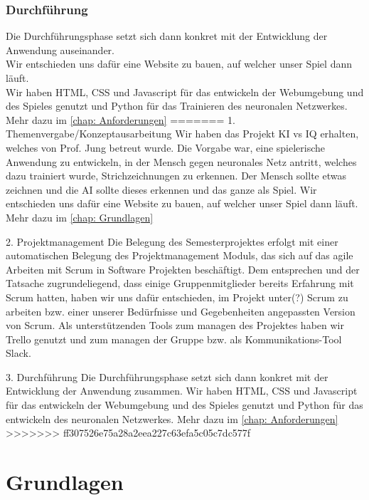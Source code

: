 \documentclass[11pt]{article}
\begin{document}
\subsubsection{ Durchführung }
Die Durchführungsphase setzt sich dann konkret mit der 					Entwicklung der Anwendung auseinander.\\
Wir entschieden uns dafür eine Website zu bauen, auf welcher 			unser Spiel dann läuft.\\
Wir haben HTML, CSS und Javascript für das entwickeln der 			Webumgebung und des Spieles genutzt und Python für das 				Trainieren des neuronalen Netzwerkes.\\
Mehr dazu im \autoref{chap: Anforderungen}
=======
1. Themenvergabe/Konzeptausarbeitung
	Wir haben das Projekt KI vs IQ erhalten, welches von Prof. Jung 		betreut wurde.
	Die Vorgabe war, eine spielerische Anwendung zu entwickeln, 			in der Mensch gegen neuronales Netz antritt, welches dazu 				trainiert wurde, Strichzeichnungen zu erkennen.
	Der Mensch sollte etwas zeichnen und die AI sollte dieses 				erkennen und das ganze als Spiel.
	Wir entschieden uns dafür eine Website zu bauen, auf welcher 			unser Spiel dann läuft. \\
	Mehr dazu im \autoref{chap: Grundlagen}

2. Projektmanagement
	Die Belegung des Semesterprojektes erfolgt mit einer 						automatischen Belegung des Projektmanagement Moduls, 				das sich auf das agile Arbeiten mit Scrum in Software 				Projekten beschäftigt. Dem entsprechen und der Tatsache 				zugrundeliegend, dass einige Gruppenmitglieder bereits 					Erfahrung mit Scrum hatten, haben wir uns dafür entschieden, im 	Projekt unter(?) Scrum zu arbeiten bzw. einer unserer 						Bedürfnisse und Gegebenheiten angepassten Version von 				Scrum.
	Als unterstützenden Tools zum managen des Projektes haben wir 	Trello genutzt und zum managen der Gruppe bzw. als 						Kommunikations-Tool Slack.
	

3. Durchführung
	Die Durchführungsphase setzt sich dann konkret mit der 					Entwicklung der Anwendung zusammen.
	Wir haben HTML, CSS und Javascript für das entwickeln der 			Webumgebung und des Spieles genutzt und Python für das 				entwickeln des neuronalen Netzwerkes.
	Mehr dazu im \autoref{chap: Anforderungen}
>>>>>>> ff307526e75a28a2eea227c63efa5c05c7dc577f

\section{Grundlagen}
\label{chap: Grundlagen}
\end{document}
